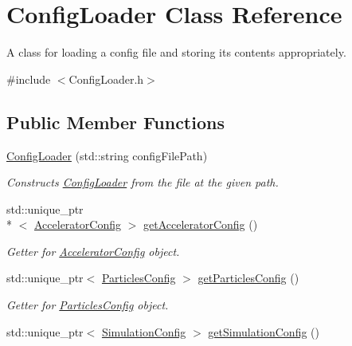 \hypertarget{classConfigLoader}{\section{Config\+Loader Class Reference}
\label{classConfigLoader}
}


A class for loading a config file and storing its contents appropriately.  




{\ttfamily \#include $<$Config\+Loader.\+h$>$}

\subsection*{Public Member Functions}
\begin{DoxyCompactItemize}
\item 
\hyperlink{classConfigLoader_abe68414c15131afa98aff4374162767a}{Config\+Loader} (std\+::string config\+File\+Path)
\begin{DoxyCompactList}\small\item\em Constructs \hyperlink{classConfigLoader}{Config\+Loader} from the file at the given path. \end{DoxyCompactList}\item 
\hypertarget{classConfigLoader_ab7d4cd59d6c3055e12020894ac62014b}{std\+::unique\+\_\+ptr\\*
$<$ \hyperlink{classAcceleratorConfig}{Accelerator\+Config} $>$ \hyperlink{classConfigLoader_ab7d4cd59d6c3055e12020894ac62014b}{get\+Accelerator\+Config} ()}\label{classConfigLoader_ab7d4cd59d6c3055e12020894ac62014b}

\begin{DoxyCompactList}\small\item\em Getter for \hyperlink{classAcceleratorConfig}{Accelerator\+Config} object. \end{DoxyCompactList}\item 
\hypertarget{classConfigLoader_a9240923bd59770bd810b9f1e2321e5a4}{std\+::unique\+\_\+ptr$<$ \hyperlink{classParticlesConfig}{Particles\+Config} $>$ \hyperlink{classConfigLoader_a9240923bd59770bd810b9f1e2321e5a4}{get\+Particles\+Config} ()}\label{classConfigLoader_a9240923bd59770bd810b9f1e2321e5a4}

\begin{DoxyCompactList}\small\item\em Getter for \hyperlink{classParticlesConfig}{Particles\+Config} object. \end{DoxyCompactList}\item 
\hypertarget{classConfigLoader_ab9bf48369cbdd85709bc72ce4245aae4}{std\+::unique\+\_\+ptr$<$ \hyperlink{classSimulationConfig}{Simulation\+Config} $>$ \hyperlink{classConfigLoader_ab9bf48369cbdd85709bc72ce4245aae4}{get\+Simulation\+Config} ()}\label{classConfigLoader_ab9bf48369cbdd85709bc72ce4245aae4}


\end{DoxyCompactItemize}
